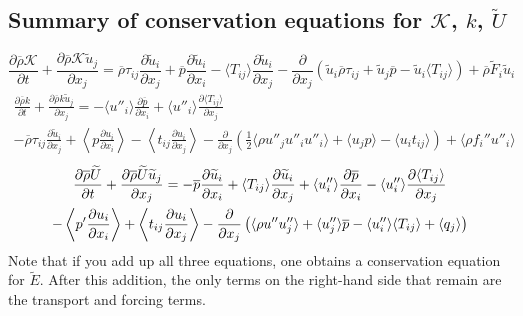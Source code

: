 \documentclass[oneside,a4paper,11pt]{report}
\newcommand{\rhoavg}{\overline{\rho}}
\newcommand{\pavg}{\overline{p}}
\newcommand{\pfluc}{p'}
\newcommand{\rs}{\tau}          %
\newcommand{\uifluc}{u_i}
\newcommand{\ujfluc}{u_j}
\newcommand{\uavgf}{\widetilde{u}}
\newcommand{\Eavgf}{\widetilde{E}}
\newcommand{\Uavgf}{\widetilde{U}}
\newcommand{\uflucf}{u''}
\begin{document}
\subsection{Summary of conservation equations for $\mathcal{K}$, $k$, $\Uavgf$}
\begin{equation}
\frac{ \partial \rhoavg \mathcal{K} }{ \partial t} + \frac{ \partial \rhoavg \mathcal{K} \uavgf_j }{ \partial x_j} = \rhoavg \rs_{ij} \frac{ \partial \uavgf_i }{ \partial x_j } + \pavg \frac{ \partial \uavgf_i }{ \partial x_i } - \langle T_{ij} \rangle \frac{ \partial \uavgf_i }{ \partial x_j } - \frac{\partial}{\partial x_j} \left ( \uavgf_i \rhoavg \rs_{ij} + \uavgf_j \pavg - \uavgf_i \langle T_{ij} \rangle \right ) + \rhoavg \tilde{F}_i \uavgf_i
\end{equation}
\begin{multline}
\frac{ \partial \rhoavg k }{ \partial t}  + \frac{ \partial \rhoavg k \uavgf_j }{ \partial x_j } = - \langle \uflucf_i \rangle \frac{ \partial \pavg }{ \partial x_i } + \langle \uflucf_i \rangle \frac{ \partial \langle T_{ij} \rangle }{ \partial x_j } \\
- \rhoavg \rs_{ij} \frac{ \partial \uavgf_i }{ \partial x_j}  + \left < p \frac{ \partial \uifluc } { \partial x_i } \right > - \left <  t_{ij} \frac{ \partial u_i }{ \partial x_j } \right > - \frac{\partial}{ \partial x_j} \left ( \frac{1}{2} \langle \rho \uflucf_j \uflucf_i \uflucf_i \rangle + \langle \ujfluc p \rangle  - \langle \uifluc t_{ij} \rangle \right ) + \langle \rho f_i'' \uflucf_i \rangle
\end{multline}
\begin{multline}
    \frac{\partial \rhoavg \Uavgf}{\partial t} + \frac{\partial \rhoavg \Uavgf \uavgf_j}{\partial x_j} = -\pavg \frac{\partial \uavgf_i}{\partial x_i} + \langle T_{ij} \rangle \frac{\partial \uavgf_i}{\partial x_j} +\langle \uflucf_i \rangle \frac{\partial \pavg}{\partial x_i} - \langle \uflucf_i \rangle \frac{\partial \langle T_{ij} \rangle}{\partial x_j} \\
    - \left < \pfluc \frac{\partial \uifluc}{\partial x_i} \right > + \left < t_{ij} \frac{\partial \uifluc}{\partial x_j} \right > - \frac{\partial}{\partial x_j} \left ( \langle \rho u'' \uflucf_j \rangle +  \langle \uflucf_j \rangle \pavg - \langle \uflucf_i \rangle \langle T_{ij} \rangle + \lbra q_j \rbra \right)
\end{multline}
Note that if you add up all three equations, one obtains a conservation equation for $\Eavgf$. After this addition, the only terms on the right-hand side that remain are the transport and forcing terms.
\end{document}
